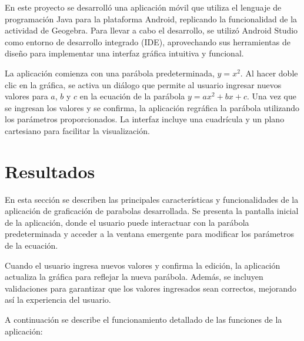 \documentclass[conference]{IEEEtran}
\begin{document}
En este proyecto se desarrolló una aplicación móvil que utiliza el lenguaje de programación Java para la plataforma Android, replicando la funcionalidad de la actividad de Geogebra. Para llevar a cabo el desarrollo, se utilizó Android Studio como entorno de desarrollo integrado (IDE), aprovechando sus herramientas de diseño para implementar una interfaz gráfica intuitiva y funcional.

La aplicación comienza con una parábola predeterminada, \(y = x^2\). Al hacer doble clic en la gráfica, se activa un diálogo que permite al usuario ingresar nuevos valores para \(a\), \(b\) y \(c\) en la ecuación de la parábola \(y = ax^2 + bx + c\). Una vez que se ingresan los valores y se confirma, la aplicación regráfica la parábola utilizando los parámetros proporcionados. La interfaz incluye una cuadrícula y un plano cartesiano para facilitar la visualización.

\section{Resultados}

En esta sección se describen las principales características y funcionalidades de la aplicación de graficación de parabolas desarrollada. Se presenta la pantalla inicial de la aplicación, donde el usuario puede interactuar con la parábola predeterminada y acceder a la ventana emergente para modificar los parámetros de la ecuación.

Cuando el usuario ingresa nuevos valores y confirma la edición, la aplicación actualiza la gráfica para reflejar la nueva parábola. Además, se incluyen validaciones para garantizar que los valores ingresados sean correctos, mejorando así la experiencia del usuario.

A continuación se describe el funcionamiento detallado de las funciones de la aplicación:
\end{document}
